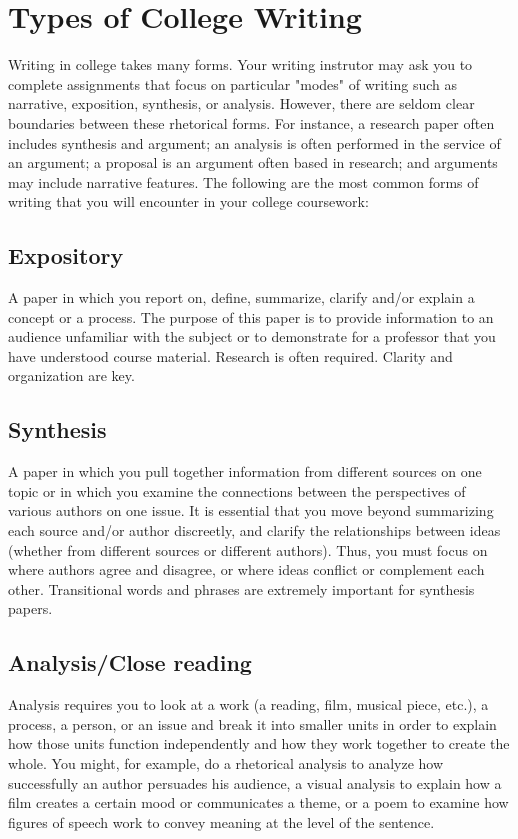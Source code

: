 
\chapter{Types of College Writing}

Writing in college takes many forms. Your writing instrutor may ask you to complete 
assignments that focus on particular "modes" of writing such as narrative, exposition, 
synthesis, or analysis. However, there are seldom clear boundaries between these 
rhetorical forms. For instance, a research paper often includes synthesis and argument; 
an analysis is often performed in the service of an argument; a proposal is an argument 
often based in research; and arguments may include narrative features. The following 
are the most common forms of writing that you will encounter in your college coursework:


\section{Expository}
A paper in which you report on, define, summarize, clarify and/or explain a concept or 
a process. The purpose of this paper is to provide information to an audience unfamiliar 
with the subject or to demonstrate for a professor that you have understood course 
material.  Research is often required. Clarity and organization are key.

\section{Synthesis}

A paper in which you pull together information from different sources on one topic or 
in which you examine the connections between the perspectives of various authors on 
one issue. It is essential that you move beyond summarizing each source and/or author 
discreetly, and clarify the relationships between ideas (whether from different sources 
or different authors). Thus, you must focus on where authors agree and disagree, or 
where ideas conflict or complement each other. Transitional words and phrases are 
extremely important for synthesis papers.

\section{Analysis/Close reading}
Analysis requires you to look at a work (a reading, film, musical piece, etc.), a process, 
a person, or an issue and break it into smaller units in order to explain how those units 
function independently and how they work together to create the whole. You might, 
for example, do a rhetorical analysis to analyze how successfully an author persuades his 
audience, a visual analysis to explain how a film creates a certain mood or communicates 
a theme, or a poem to examine how figures of speech work to convey meaning at the 
level of the sentence.

